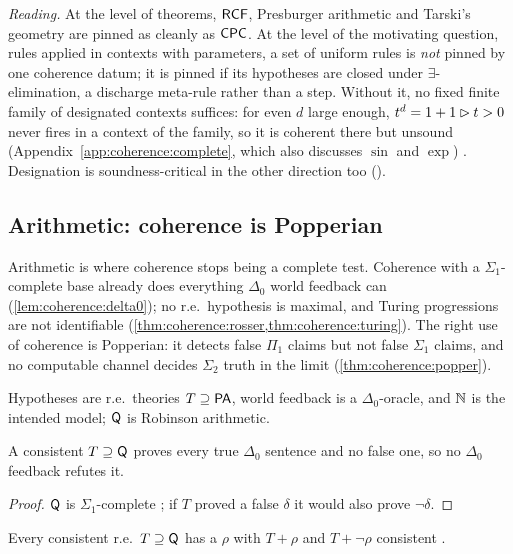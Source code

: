\emph{Reading.} At the level of theorems, $\mathsf{RCF}$, Presburger arithmetic and Tarski's geometry are pinned as cleanly as $\mathsf{CPC}$. At the level of the motivating question, rules applied in contexts with parameters, a set of uniform rules is \emph{not} pinned by one coherence datum; it is pinned if its hypotheses are closed under $\exists$-elimination, a discharge meta-rule rather than a step. Without it, no fixed finite family of designated contexts suffices: for even $d$ large enough, $t^d=1+1\rhd t>0$ never fires in a context of the family, so it is coherent there but unsound (Appendix~\ref{app:coherence:complete}, which also discusses $\sin$ and $\exp$) . Designation is soundness-critical in the other direction too ().

\subsection{Arithmetic: coherence is Popperian}\label{sec:coherence:arith}

Arithmetic is where coherence stops being a complete test. Coherence with a $\Sigma_1$-complete base already does everything $\Delta_0$ world feedback can (\cref{lem:coherence:delta0}); no r.e.\ hypothesis is maximal, and Turing progressions are not identifiable (\cref{thm:coherence:rosser,thm:coherence:turing}). The right use of coherence is Popperian: it detects false $\Pi_1$ claims but not false $\Sigma_1$ claims, and no computable channel decides $\Sigma_2$ truth in the limit (\cref{thm:coherence:popper}).

Hypotheses are r.e.\ theories $T\supseteq\mathsf{PA}$, world feedback is a $\Delta_0$-oracle, and $\mathbb{N}$ is the intended model; $\mathsf{Q}$ is Robinson arithmetic.

\begin{lemma}\label{lem:coherence:delta0}
A consistent $T\supseteq\mathsf{Q}$ proves every true $\Delta_0$ sentence and no false one, so no $\Delta_0$ feedback refutes it.
\end{lemma}

\begin{proof}
$\mathsf{Q}$ is $\Sigma_1$-complete \citep{boolos2007computability}; if $T$ proved a false $\delta$ it would also prove $\neg\delta$.
\end{proof}

\begin{theorem}\label{thm:coherence:rosser}
Every consistent r.e.\ $T\supseteq\mathsf{Q}$ has a $\rho$ with $T+\rho$ and $T+\neg\rho$ consistent \citep{godel1931formal,rosser1936extensions,tarski1953undecidable}.
\end{theorem}

